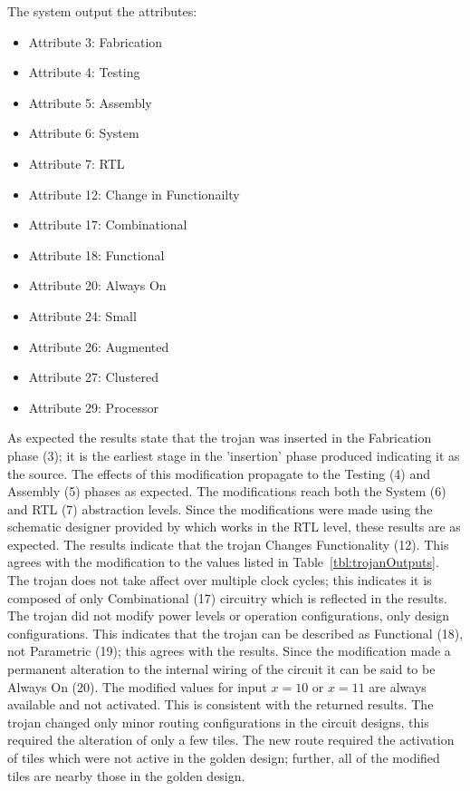 The system output the attributes:
\begin{itemize}
	\item Attribute 3: Fabrication
	\item Attribute 4: Testing
	\item Attribute 5: Assembly
	\item Attribute 6: System
	\item Attribute 7: RTL
	\item Attribute 12: Change in Functionailty
	\item Attribute 17: Combinational
	\item Attribute 18: Functional
	\item Attribute 20: Always On
	\item Attribute 24: Small
	\item Attribute 26: Augmented
	\item Attribute 27: Clustered
	\item Attribute 29: Processor
\end{itemize}
As expected the results state that the trojan was inserted in the Fabrication phase (3); it is the earliest stage in the 'insertion' phase produced indicating it as the source.
The effects of this modification propagate to the Testing (4) and Assembly (5) phases as expected.
The modifications reach both the System (6) and \acrfull{RTL} (7) abstraction levels.
Since the modifications were made using the schematic designer provided by \Xilinx which works in the \acrshort{RTL} level, these results are as expected.
The results indicate that the trojan Changes Functionality (12). 
This agrees with the modification to the values listed in Table~\ref{tbl:trojanOutputs}.
The trojan does not take affect over multiple clock cycles; this indicates it is composed of only Combinational (17) circuitry which is reflected in the results.
The trojan did not modify power levels or operation configurations, only design configurations.
This indicates that the trojan can be described as Functional (18), not Parametric (19); this agrees with the results.
Since the modification made a permanent alteration to the internal wiring of the circuit it can be said to be Always On (20).
The modified values for input $x=10$ or $x=11$ are always available and not activated.
This is consistent with the returned results.
The trojan changed only minor routing configurations in the circuit designs, this required the alteration of only a few tiles.
The new route required the activation of tiles which were not active in the \gls{golden} design; further, all of the modified tiles are nearby those in the \gls{golden} design. 
